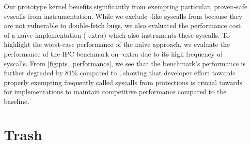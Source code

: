 \documentclass[letterpaper,twocolumn,10pt, anonymous]{article}
\begin{document}
Our prototype \tiktok kernel benefits significantly from 
exempting particular, proven-safe syscalls from instrumentation.
While we exclude -like syscalls from \tiktok because they 
are not vulnerable to double-fetch bugs, we also evaluated the
performance cost of a na\"ive implementation (\tiktok-extra)
which also instruments these syscalls.
To highlight the worst-case performance of the na\"ive approach, we 
evaluate the performance of the IPC benchmark on \tiktok-extra due 
to its high frequency of  syscalls.
From \autoref{fig:pts_performance}, we see that the benchmark's 
performance is further degraded by $81\%$ compared to \tiktok, 
showing that developer effort towards properly exempting 
frequently called syscalls from \tiktok protections is crucial
towards for implementations to maintain competitive performance
compared to the baseline.

\section{Trash}






\end{document}
